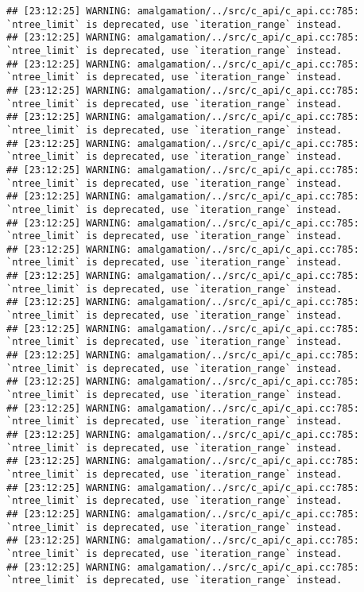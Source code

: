 \documentclass[
]{article}
\begin{document}
\begin{verbatim}
## [23:12:25] WARNING: amalgamation/../src/c_api/c_api.cc:785: `ntree_limit` is deprecated, use `iteration_range` instead.
## [23:12:25] WARNING: amalgamation/../src/c_api/c_api.cc:785: `ntree_limit` is deprecated, use `iteration_range` instead.
## [23:12:25] WARNING: amalgamation/../src/c_api/c_api.cc:785: `ntree_limit` is deprecated, use `iteration_range` instead.
## [23:12:25] WARNING: amalgamation/../src/c_api/c_api.cc:785: `ntree_limit` is deprecated, use `iteration_range` instead.
## [23:12:25] WARNING: amalgamation/../src/c_api/c_api.cc:785: `ntree_limit` is deprecated, use `iteration_range` instead.
## [23:12:25] WARNING: amalgamation/../src/c_api/c_api.cc:785: `ntree_limit` is deprecated, use `iteration_range` instead.
## [23:12:25] WARNING: amalgamation/../src/c_api/c_api.cc:785: `ntree_limit` is deprecated, use `iteration_range` instead.
## [23:12:25] WARNING: amalgamation/../src/c_api/c_api.cc:785: `ntree_limit` is deprecated, use `iteration_range` instead.
## [23:12:25] WARNING: amalgamation/../src/c_api/c_api.cc:785: `ntree_limit` is deprecated, use `iteration_range` instead.
## [23:12:25] WARNING: amalgamation/../src/c_api/c_api.cc:785: `ntree_limit` is deprecated, use `iteration_range` instead.
## [23:12:25] WARNING: amalgamation/../src/c_api/c_api.cc:785: `ntree_limit` is deprecated, use `iteration_range` instead.
## [23:12:25] WARNING: amalgamation/../src/c_api/c_api.cc:785: `ntree_limit` is deprecated, use `iteration_range` instead.
## [23:12:25] WARNING: amalgamation/../src/c_api/c_api.cc:785: `ntree_limit` is deprecated, use `iteration_range` instead.
## [23:12:25] WARNING: amalgamation/../src/c_api/c_api.cc:785: `ntree_limit` is deprecated, use `iteration_range` instead.
## [23:12:25] WARNING: amalgamation/../src/c_api/c_api.cc:785: `ntree_limit` is deprecated, use `iteration_range` instead.
## [23:12:25] WARNING: amalgamation/../src/c_api/c_api.cc:785: `ntree_limit` is deprecated, use `iteration_range` instead.
## [23:12:25] WARNING: amalgamation/../src/c_api/c_api.cc:785: `ntree_limit` is deprecated, use `iteration_range` instead.
## [23:12:25] WARNING: amalgamation/../src/c_api/c_api.cc:785: `ntree_limit` is deprecated, use `iteration_range` instead.
## [23:12:25] WARNING: amalgamation/../src/c_api/c_api.cc:785: `ntree_limit` is deprecated, use `iteration_range` instead.
## [23:12:25] WARNING: amalgamation/../src/c_api/c_api.cc:785: `ntree_limit` is deprecated, use `iteration_range` instead.
## [23:12:25] WARNING: amalgamation/../src/c_api/c_api.cc:785: `ntree_limit` is deprecated, use `iteration_range` instead.
## [23:12:25] WARNING: amalgamation/../src/c_api/c_api.cc:785: `ntree_limit` is deprecated, use `iteration_range` instead.

\end{verbatim}
\end{document}
